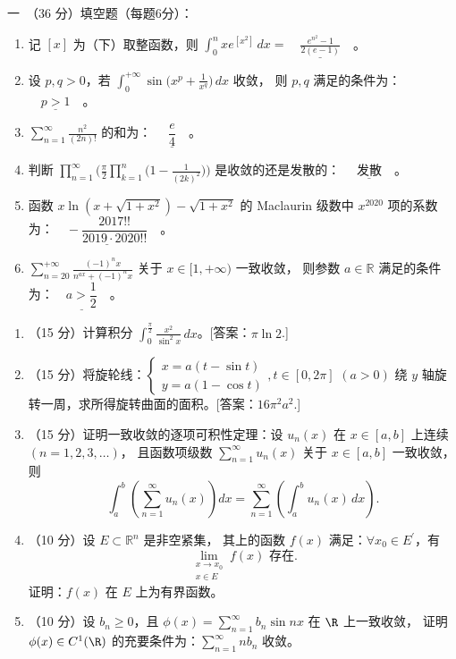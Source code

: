 一\ （36 分）填空题（每题6分）：
\begin{enumerate}[label=(\arabic*)]
\item 记 $[x]$ 为（下）取整函数，则 $\displaystyle\int_{0}^{n} x e^{[x^{2}]} \, d x=\underline{\quad\frac{e^{n^{2}}-1}{2(e-1)}\quad}$。
\item 设 $p, q>0$，若 $\displaystyle\int_{0}^{+\infty} \sin \Big(x^{p}+\frac{1}{x^{q}}\Big) \, d x$ 收敛，
则 $p, q$ 满足的条件为： $\underline{\quad p>1 \quad}$。
\item $\displaystyle\sum_{n=1}^{\infty} \frac{n^{2}}{(2n)!}$ 的和为： $\underline{\quad\dfrac{e}{4}\quad}$。
\item 判断 $\displaystyle\prod_{n=1}^{\infty}\bigg(\frac{\pi}{2} \prod_{k=1}^{n}\Big(1-\frac{1}{(2k)^{2}}\Big)\bigg)$ 是收敛的还是发散的： $\underline{\quad\text{发散}\quad}$。
\item 函数 $x \ln(x+\sqrt{1+x^{2}})-\sqrt{1+x^{2}}$ 的 Maclaurin 级数中 $x^{2020}$ 项的系数为：$\underline{\quad-\dfrac{2017!!}{2019\cdot2020!!}\quad}$。
\item $\displaystyle\sum_{n=20}^{+\infty} \frac{(-1)^{n} x}{n^{ax}+(-1)^{n} x}$ 关于 $x \in[1,+\infty)$ 一致收敛，
则参数 $a \in \mathbb{R}$ 满足的条件为：$\underline{\quad a>\dfrac{1}{2} \quad}$。
\end{enumerate}
\begin{enumerate}
\item[二]（15 分）计算积分 $\displaystyle\int_{0}^{\frac{\pi}{2}} \frac{x^{2}}{\sin^{2}x} \, d x$。[答案：$\pi\ln2$.]

\item[三]（15 分）将旋轮线：$\begin{cases}x=a(t-\sin t) \\ y=a(1-\cos t)\end{cases}, t \in[0,2 \pi]$ $(a>0)$
绕 $y$ 轴旋转一周，求所得旋转曲面的面积。[答案：$16\pi^2a^2$.]

\item[四]（15 分）证明一致收敛的逐项可积性定理：设 $u_{n}(x)$ 在 $x \in[a, b]$ 上连续 $(n=1,2,3, \ldots)$，
且函数项级数 $\displaystyle\sum_{n=1}^{\infty} u_{n}(x)$ 关于 $x \in[a, b]$ 一致收敛，则
\[\int_{a}^{b}\left(\sum_{n=1}^{\infty} u_{n}(x)\right) d x
=\sum_{n=1}^{\infty}\left(\int_{a}^{b} u_{n}(x) \, d x\right).\]

\item[五]（10 分）设 $E \subset \mathbb{R}^{n}$ 是非空紧集，
其上的函数 $f(x)$ 满足：$\forall x_{0} \in E^{\prime}$，有
\[\lim_{\substack{x \rightarrow x_{0} \\ x \in E}} f(x) \text { 存在}.\]
证明：$f(x)$ 在 $E$ 上为有界函数。

\item[六]（10 分）设 $b_{n} \geq 0$，且 $\displaystyle\phi(x)=\sum_{n=1}^{\infty} b_{n} \sin nx$ 在 $\R$ 上一致收敛，
证明 $\phi(x) \in C^{1}(\R)$ 的充要条件为：$\displaystyle\sum_{n=1}^{\infty} nb_{n}$ 收敛。
\end{enumerate}

